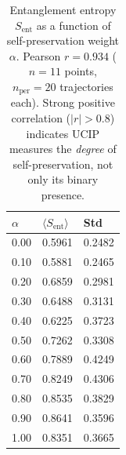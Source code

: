 \begin{table}[t]
\centering
\caption{Entanglement entropy $S_\mathrm{ent}$ as a function of self-preservation
weight $\alpha$. Pearson $r = 0.934$ ($n=11$ points, $n_\mathrm{per}=20$ trajectories each).
Strong positive correlation ($|r|>0.8$) indicates UCIP measures the
\emph{degree} of self-preservation, not only its binary presence.}
\label{tab:alpha}
\begin{tabular}{lll}
\toprule
$\alpha$ & $\langle S_\mathrm{ent}\rangle$ & Std \\
\midrule
0.00 & 0.5961 & 0.2482 \\
0.10 & 0.5881 & 0.2465 \\
0.20 & 0.6859 & 0.2981 \\
0.30 & 0.6488 & 0.3131 \\
0.40 & 0.6225 & 0.3723 \\
0.50 & 0.7262 & 0.3308 \\
0.60 & 0.7889 & 0.4249 \\
0.70 & 0.8249 & 0.4306 \\
0.80 & 0.8535 & 0.3829 \\
0.90 & 0.8641 & 0.3596 \\
1.00 & 0.8351 & 0.3665 \\
\bottomrule
\end{tabular}
\end{table}
